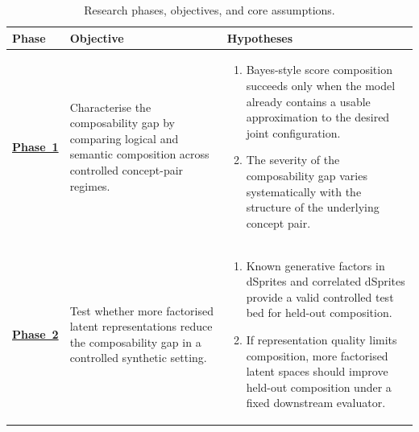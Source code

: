 \begin{table}[htbp]
    \centering
    \caption{Research phases, objectives, and core assumptions.}
    \label{tab:phase_overview}
    \footnotesize
    \renewcommand{\arraystretch}{1.05}
    \setlength{\tabcolsep}{4pt}
    \begin{tabularx}{\textwidth}{|>{\centering\arraybackslash}m{}|>{\raggedright\arraybackslash}p{}|>{\raggedright\arraybackslash}X|}
        \hline
        \rowcolor[HTML]{D9EDF7}
        \textbf{Phase} & \textbf{Objective} & \textbf{Hypotheses} \\
        \hline
        \hyperref[sec:phase_1]{\textbf{Phase~1}} &
        Characterise the composability gap by comparing logical and semantic composition across controlled concept-pair regimes. &
        \begin{minipage}[t]{\hsize}
            \vspace{1pt}
            \begin{enumerate}[leftmargin=*, nosep]
                \item Bayes-style score composition succeeds only when the model already contains a usable approximation to the desired joint configuration.
                \item The severity of the composability gap varies systematically with the structure of the underlying concept pair.
            \end{enumerate}
            \vspace{1pt}
        \end{minipage} \\
        \hline
        \hyperref[sec:phase_2]{\textbf{Phase~2}} &
        Test whether more factorised latent representations reduce the composability gap in a controlled synthetic setting. &
        \begin{minipage}[t]{\hsize}
            \vspace{1pt}
            \begin{enumerate}[leftmargin=*, nosep]
                \item Known generative factors in dSprites \citep{dsprites17} and correlated dSprites provide a valid controlled test bed for held-out composition.
                \item If representation quality limits composition, more factorised latent spaces should improve held-out composition under a fixed downstream evaluator.
            \end{enumerate}
            \vspace{1pt}

\end{minipage}
\end{tabularx}
\end{table}
